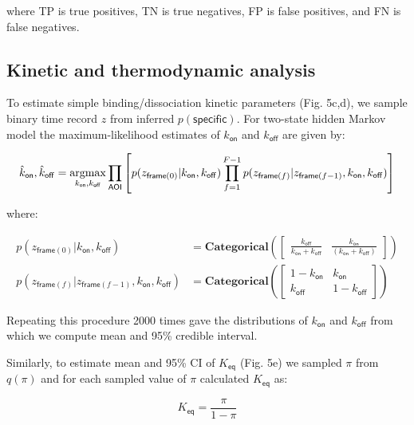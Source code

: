 \noindent
where TP is true positives, TN is true negatives, FP is false positives, and FN is false negatives.

\subsection*{Kinetic and thermodynamic analysis}

To estimate simple binding/dissociation kinetic parameters (Fig. 5c,d), we sample binary time record $z$ from inferred $p(\mathsf{specific})$. For two-state hidden Markov model the maximum-likelihood estimates of $k_\mathsf{on}$ and $k_\mathsf{off}$ are given by:


\begin{equation}
    \hat{k}_\mathsf{on}, \hat{k}_\mathsf{off} = \operatorname*{argmax}_{k_\mathsf{on}, k_\mathsf{off}} \prod_\mathsf{AOI} \left[ p(z_{\mathsf{frame}(0)} | k_\mathsf{on}, k_\mathsf{off}) \prod_{f=1}^{F-1} p(z_{\mathsf{frame}(f)} | z_{\mathsf{frame}(f-1)}, k_\mathsf{on}, k_\mathsf{off}) \right]
\end{equation}

where:

\begin{subequations}
\begin{align}
    p(z_{\mathsf{frame}(0)} | k_\mathsf{on}, k_\mathsf{off}) &= \mathbf{Categorical} \left( \begin{bmatrix} \frac{k_\mathsf{off}}{k_\mathsf{on} + k_\mathsf{off}} & \frac{k_\mathsf{on}}{\left( k_\mathsf{on} + k_\mathsf{off} \right)} \end{bmatrix} \right) \\
    p(z_{\mathsf{frame}(f)} | z_{\mathsf{frame}(f-1)}, k_\mathsf{on}, k_\mathsf{off}) &= \mathbf{Categorical} \left( \begin{bmatrix} 1 - k_\mathsf{on} & k_\mathsf{on} \\ k_\mathsf{off} & 1 - k_\mathsf{off} \end{bmatrix} \right)
\end{align}
\end{subequations}

Repeating this procedure 2000 times gave the distributions of $k_\mathsf{on}$ and $k_\mathsf{off}$ from which we compute mean and 95\% credible interval.

Similarly, to estimate mean and 95\% CI of $K_\mathsf{eq}$ (Fig. 5e) we sampled $\pi$ from $q(\pi)$ and for each sampled value of $\pi$ calculated $K_\mathsf{eq}$ as:

\begin{equation}
    K_\mathsf{eq} = \dfrac{\pi}{1 - \pi}
\end{equation}


